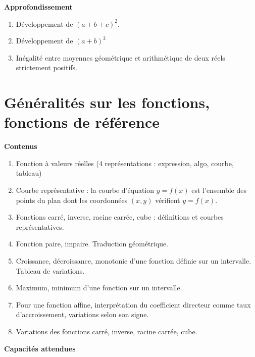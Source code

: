 \documentclass[10pt,a4paper]{article}
\begin{document}
\textbf{Approfondissement}

\begin{enumerate}
\item Développement de $(a + b + c)^2$.
\item Développement de $(a + b)^3$
\item Inégalité entre moyennes géométrique et arithmétique de deux réels strictement positifs.
\end{enumerate}

\section{Généralités sur les fonctions, fonctions de référence}

\textbf{Contenus}

\begin{enumerate}
\item Fonction à valeurs réelles (4 représentations : expression, algo, courbe, tableau)
\item Courbe représentative : la courbe d'équation $y = f(x)$ est l'ensemble des points du 
plan dont les coordonnées $(x,y)$ vérifient $y = f(x)$.
\item Fonctions carré, inverse, racine carrée, cube : définitions et courbes représentatives.
\item Fonction paire, impaire. Traduction géométrique.
\item Croissance, décroissance, monotonie d'une fonction définie sur un intervalle. Tableau 
de variations.
\item Maximum, minimum d'une fonction sur un intervalle.
\item Pour une fonction affine, interprétation du coefficient directeur comme taux 
d'accroissement, variations selon son signe.
\item Variations des fonctions carré, inverse, racine carrée, cube.
\end{enumerate}

\textbf{Capacités attendues}
\end{document}
